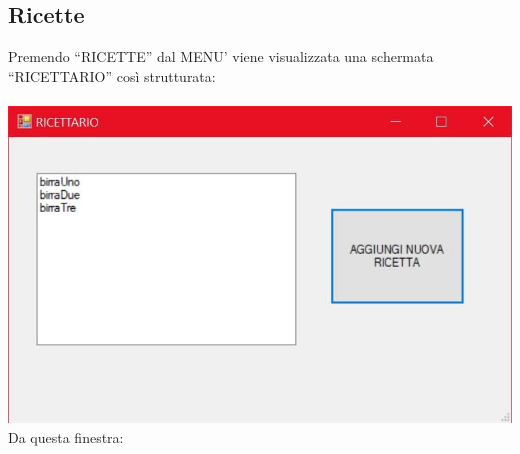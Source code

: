 \documentclass[a4paper, titlepage]{article}
\begin{document}
\subsection{Ricette}
Premendo “RICETTE” dal MENU’ viene visualizzata una schermata “RICETTARIO” così strutturata:\\\\
\includegraphics[scale=0.30]{Immagini/form/Form GestioneRicette.jpg}
\\Da questa finestra:
\end{document}
